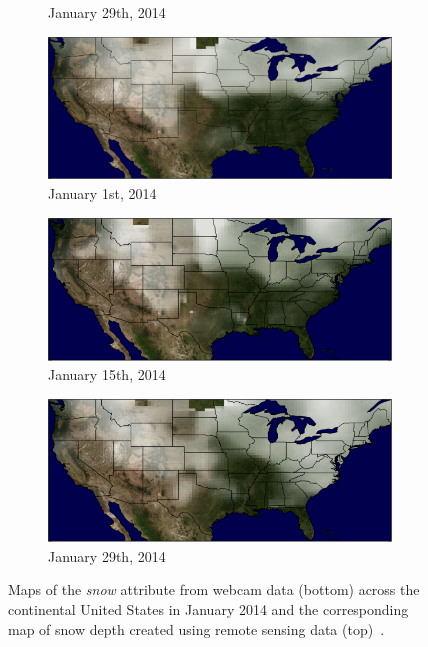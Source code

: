 \documentclass[10pt,twocolumn,letterpaper]{article}
\begin{document}
\begin{figure}
\begin{subfigure}[b]{0.33\textwidth}
    \caption{January 29th, 2014}
    \label{fig:snow_map_gt_3}
  \end{subfigure}
  \begin{subfigure}[b]{0.33\textwidth}
    \centering
		\includegraphics[width=\textwidth, trim= 0mm 0mm 0mm 0mm]{figs/snow_map_1.png}
    \caption{January 1st, 2014}
    \label{fig:snow_map_est_1}
  \end{subfigure}
  \begin{subfigure}[b]{0.33\textwidth}
    \centering
		\includegraphics[width=\textwidth, trim= 0mm 0mm 0mm 0mm]{figs/snow_map_2.png}
    \caption{January 15th, 2014}
    \label{fig:snow_map_est_2}
  \end{subfigure}
  \begin{subfigure}[b]{0.33\textwidth}
    \centering
		\includegraphics[width=\textwidth, trim= 0mm 0mm 0mm 0mm]{figs/snow_map_3.png}
    \caption{January 29th, 2014}
    \label{fig:snow_map_est_3}
  \end{subfigure}
  \caption{Maps of the \emph{snow} attribute from webcam data (bottom)
           across the continental United States in January 2014 and the
           corresponding map of snow depth created using remote 
           sensing data (top)~\cite{noaasite}.} 
  \label{fig:snow_maps}
\end{figure}
\end{document}
